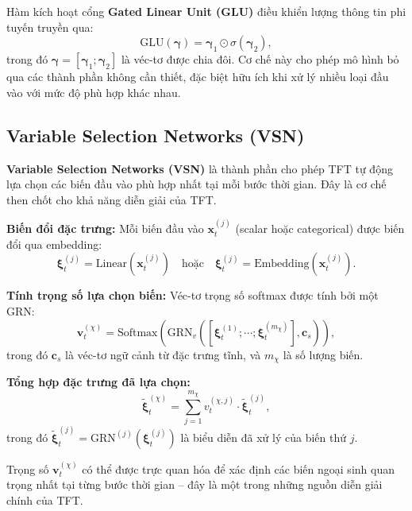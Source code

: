 Hàm kích hoạt cổng \textbf{Gated Linear Unit (GLU)} điều khiển lượng thông tin phi tuyến truyền qua:
\begin{equation}
    \text{GLU}(\boldsymbol{\gamma}) = \boldsymbol{\gamma}_1 \odot \sigma(\boldsymbol{\gamma}_2),
    \label{eq:glu}
\end{equation}
trong đó $\boldsymbol{\gamma} = [\boldsymbol{\gamma}_1; \boldsymbol{\gamma}_2]$ là véc-tơ được chia đôi. Cơ chế này cho phép mô hình bỏ qua các thành phần không cần thiết, đặc biệt hữu ích khi xử lý nhiều loại đầu vào với mức độ phù hợp khác nhau.

\subsection{Variable Selection Networks (VSN)}
\label{subsec:vsn}

\textbf{Variable Selection Networks (VSN)} là thành phần cho phép TFT tự động lựa chọn các biến đầu vào phù hợp nhất tại mỗi bước thời gian. Đây là cơ chế then chốt cho khả năng diễn giải của TFT.

\textbf{Biến đổi đặc trưng:} Mỗi biến đầu vào $\mathbf{x}^{(j)}_t$ (scalar hoặc categorical) được biến đổi qua embedding:
\begin{equation}
    \boldsymbol{\xi}^{(j)}_t = \text{Linear}(\mathbf{x}^{(j)}_t) \quad \text{hoặc} \quad \boldsymbol{\xi}^{(j)}_t = \text{Embedding}(\mathbf{x}^{(j)}_t).
    \label{eq:var_embedding}
\end{equation}

\textbf{Tính trọng số lựa chọn biến:} Véc-tơ trọng số softmax được tính bởi một GRN:
\begin{equation}
    \mathbf{v}^{(\chi)}_t = \text{Softmax}\!\left(\text{GRN}_v\!\left([\boldsymbol{\xi}^{(1)}_t; \cdots; \boldsymbol{\xi}^{(m_\chi)}_t], \mathbf{c}_s\right)\right),
    \label{eq:vsn_weights}
\end{equation}
trong đó $\mathbf{c}_s$ là véc-tơ ngữ cảnh từ đặc trưng tĩnh, và $m_\chi$ là số lượng biến.

\textbf{Tổng hợp đặc trưng đã lựa chọn:}
\begin{equation}
    \tilde{\boldsymbol{\xi}}^{(\chi)}_t = \sum_{j=1}^{m_\chi} v^{(\chi,j)}_t \cdot \tilde{\boldsymbol{\xi}}^{(j)}_t,
    \label{eq:vsn_aggregate}
\end{equation}
trong đó $\tilde{\boldsymbol{\xi}}^{(j)}_t = \text{GRN}^{(j)}(\boldsymbol{\xi}^{(j)}_t)$ là biểu diễn đã xử lý của biến thứ $j$.

Trọng số $\mathbf{v}^{(\chi)}_t$ có thể được trực quan hóa để xác định các biến ngoại sinh quan trọng nhất tại từng bước thời gian -- đây là một trong những nguồn diễn giải chính của TFT.

